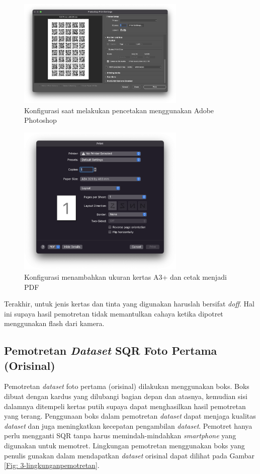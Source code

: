 \begin{figure}[!h]
	\centering
	\includegraphics[width=8cm]{contents/chapter-3/3-konfigurasips1.png}
	\caption{Konfigurasi saat melakukan pencetakan menggunakan Adobe Photoshop}
	\label{Fig: 3-konfigurasips1}
\end{figure}

\begin{figure}[!h]
	\centering
	\includegraphics[width=8cm]{contents/chapter-3/3-konfigurasips2.png}
	\caption{Konfigurasi menambahkan ukuran kertas A3+ dan cetak menjadi PDF}
	\label{Fig: 3-konfigurasips2}
\end{figure}

\noindent Terakhir, untuk jenis kertas dan tinta yang digunakan haruslah bersifat \emph{doff}. Hal ini supaya hasil pemotretan tidak memantulkan cahaya ketika dipotret menggunakan flash dari kamera.

\subsection{Pemotretan \emph{Dataset} SQR Foto Pertama (Orisinal)} \label{Pemotretan Dataset SQR Foto Pertama (Orisinal)} Pemotretan \emph{dataset} foto pertama (orisinal) dilakukan menggunakan
boks. Boks dibuat dengan kardus yang dilubangi bagian depan dan atasnya, kemudian sisi dalamnya ditempeli kertas putih supaya dapat menghasilkan hasil
pemotretan yang terang. Penggunaan boks dalam pemotretan \emph{dataset} dapat menjaga kualitas \emph{dataset} dan juga meningkatkan kecepatan pengambilan
\emph{dataset}. Pemotret hanya perlu mengganti SQR tanpa harus memindah-mindahkan \emph{smartphone} yang digunakan untuk memotret. Lingkungan pemotretan
menggunakan boks yang penulis gunakan dalam mendapatkan \emph{dataset} orisinal dapat dilihat pada Gambar \ref{Fig: 3-lingkunganpemotretan}.

